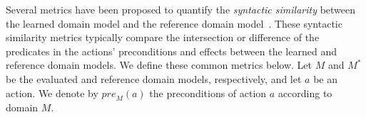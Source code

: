 \documentclass{article}
\theoremstyle{definition}
\theoremstyle{remark}
\newcommand{\realm}{{\ensuremath{M^*}}\xspace}
\newcommand{\pre}{\ensuremath{\textit{pre}}\xspace}
\newif\ifaddcomments
\newcommand{\roni}[1]{\ifaddcomments{\textcolor{red}{[Roni: #1]}}\fi}
\newcommand{\cm}[1]{\ifaddcomments{\textcolor{olive}{[Christian: #1]}}\fi}
\begin{document}
Several metrics have been proposed to quantify the \emph{syntactic similarity} between the learned domain model and the reference domain model~\citep{aineto2019learning,mordoch2023safe,xi2024neuro,Oswald2024DLLMDomainModeling}.
These syntactic similarity metrics typically compare the intersection or difference of the predicates in the actions' preconditions and effects between the learned and reference domain models. We define these common metrics below. 
Let $M$ and $\realm$ be the evaluated and reference domain models, respectively, and let $a$ be an action. We denote by $\pre_M(a)$ the preconditions of action $a$ according to domain $M$.

\end{document}

